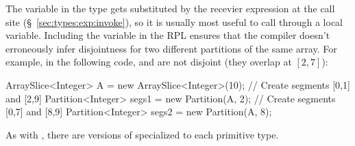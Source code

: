 The variable  in the type gets substituted by the recevier
expression at the call site (\S~\ref{sec:types:exp:invoke}), so it is
usually most useful to call  through a  local
variable.  Including the variable in the RPL ensures that the compiler
doesn't erroneously infer disjointness for two different partitions of
the same array.  For example, in the following code,
 and  are not disjoint (they
overlap at $[2,7]$):
%
\begin{dpjlisting}
ArraySlice<Integer> A = new ArraySlice<Integer>(10);
// Create segments [0,1] and [2,9]
Partition<Integer> segs1 = new Partition(A, 2);
// Create segments [0,7] and [8,9]
Partition<Integer> segs2 = new Partition(A, 8);
\end{dpjlisting}

 As with , there are
versions of  specialized to each primitive type.


